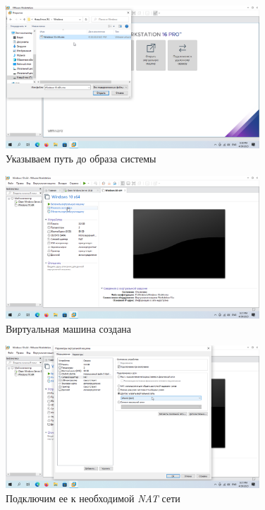 \documentclass[a4paper]{article}
\begin{document}
  \begin{figure}[H]
    \centering
    \includegraphics[width=0.85\textwidth]{Screenshot_78}
    \caption{Указываем путь до образа системы}
    \label{img:78}
  \end{figure}

  \begin{figure}[H]
    \centering
    \includegraphics[width=0.85\textwidth]{Screenshot_79}
    \caption{Виртуальная машина создана}
    \label{img:79}
  \end{figure}

  \begin{figure}[H]
    \centering
    \includegraphics[width=0.85\textwidth]{Screenshot_80}
    \caption{Подключим ее к необходимой \textit{NAT} сети}
    \label{img:80}
  \end{figure}
\end{document}
